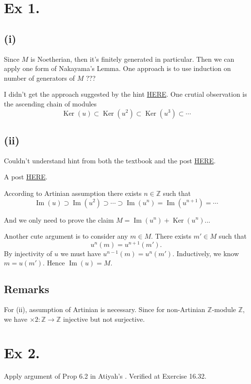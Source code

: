 \section{Ex 1.}\label{Atiyah Chapter 6 Ex 1.}

\subsection{(i)}

Since $M$ is Noetherian, then it's finitely generated in particular. 
Then we can apply one form of Nakayama's Lemma.
One approach is to use induction on number of generators of $M$ ??? 

I didn't get the approach suggested by the hint \href{https://math.stackexchange.com/questions/145310/proving-that-surjective-endomorphisms-of-noetherian-modules-are-isomorphisms-and}{HERE}.
One crutial observation is the ascending chain of modules
$$\operatorname{Ker}(u)\subset\operatorname{Ker}(u^2)\subset\operatorname{Ker}(u^3)\subset\cdots$$

\subsection{(ii)}

Couldn't understand hint from both the textbook and the post \href{https://math.stackexchange.com/questions/145310/proving-that-surjective-endomorphisms-of-noetherian-modules-are-isomorphisms-and}{HERE}. 

A post \href{https://math.stackexchange.com/questions/273181/if-m-is-an-artinian-module-and-f-m-to-m-is-an-injective-homomorphism-then}{HERE}.

According to Artinian assumption there exists $n\in \mathbb Z$ such that 
$$\operatorname{Im}(u)\supset\operatorname{Im}(u^2)\supset\cdots\supset \operatorname{Im}(u^n)=\operatorname{Im}(u^{n+1})=\cdots$$

And we only need to prove the claim $M=\operatorname{Im}(u^n)+\operatorname{Ker}(u^n)$... 

Another cute argument is to consider any $m\in M$. There exists $m'\in M$ such that 
$$u^n(m)=u^{n+1}(m').$$
By injectivity of $u$ we must have $u^{n-1}(m)=u^n(m')$. Inductively, we know $m=u(m')$. Hence $\operatorname{Im}(u)=M$.

\subsection{Remarks}
For (ii), assumption of Artinian is necessary. Since for non-Artinian $\mathbb Z$-module $\mathbb Z$, we have $\times 2:\mathbb Z\to \mathbb Z$ injective but not surjective.

\section{Ex 2.}

Apply argument of Prop 6.2 in Atiyah's \cite{atiyah1994introduction}.
Verified at \cite{altman} Exercise 16.32. 